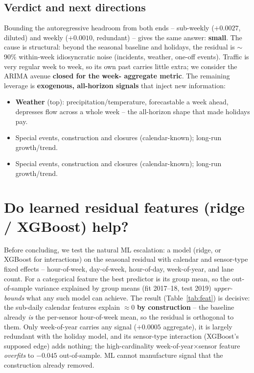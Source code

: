 \documentclass[11pt]{article}
\begin{document}
\subsection{Verdict and next directions}
Bounding the autoregressive headroom from both ends -- sub-weekly ($+0.0027$,
diluted) and weekly ($+0.0010$, redundant) -- gives the same answer:
\textbf{small}. The cause is structural: beyond the seasonal baseline and
holidays, the residual is $\sim$90\% within-week idiosyncratic noise (incidents,
weather, one-off events). Traffic is very regular week to week, so its own past
carries little extra; we consider the ARIMA avenue \textbf{closed for the week-
aggregate metric}. The remaining leverage is \textbf{exogenous, all-horizon
signals} that inject new information:
\begin{itemize}
\item \textbf{Weather} (top): precipitation/temperature, forecastable a week
  ahead, depresses flow across a whole week -- the all-horizon shape that made
  holidays pay.
\item Special events, construction and closures (calendar-known); long-run
  growth/trend.
\item Special events, construction and closures (calendar-known); long-run
  growth/trend.
\end{itemize}

\section{Do learned residual features (ridge / XGBoost) help?}
\label{sec:feat}
Before concluding, we test the natural ML escalation: a model (ridge, or XGBoost
for interactions) on the seasonal residual with calendar and sensor-type fixed
effects -- hour-of-week, day-of-week, hour-of-day, week-of-year, and lane count.
For a categorical feature the best predictor is its group mean, so the
out-of-sample variance explained by group means (fit 2017--18, test 2019)
\emph{upper-bounds} what any such model can achieve. The result
(Table~\ref{tab:feat}) is decisive: the sub-daily calendar features explain
$\approx0$ \textbf{by construction} -- the baseline already \emph{is} the
per-sensor hour-of-week mean, so the residual is orthogonal to them. Only
week-of-year carries any signal ($+0.0005$ aggregate), it is largely redundant
with the holiday model, and its sensor-type interaction (XGBoost's supposed edge)
adds nothing; the high-cardinality week-of-year$\times$sensor feature
\emph{overfits} to $-0.045$ out-of-sample. ML cannot manufacture signal that the
construction already removed.
\end{document}
